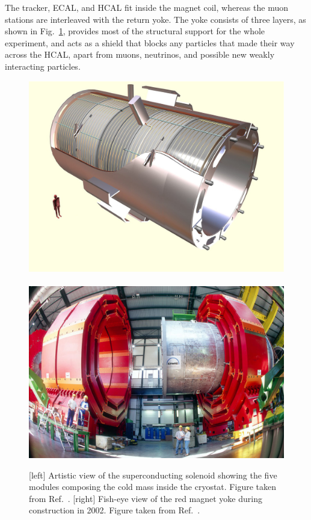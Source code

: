 The tracker, ECAL, and HCAL fit inside the magnet coil, whereas the muon stations are interleaved
with the return yoke. The yoke consists of three layers, as shown in Fig.~\ref{fig:cms_magnet},
provides most of the structural support for the whole experiment, and acts as a shield that blocks
any particles that made their way across the HCAL, apart from muons, neutrinos, and possible new
weakly interacting particles. 

\begin{figure}[htpb]
  \centering
  \includegraphics[height=0.2\textheight,clip=true,trim=0 2cm 0 0]{figures/cms/CMS_solenoid}
  ~
  \includegraphics[height=0.2\textheight]{figures/cms/cms_magnet}
  \caption{[left] Artistic view of the superconducting solenoid showing the five modules composing
the cold mass inside the cryostat. Figure taken from Ref.~\cite{Chatrchyan:2008aa}.
  [right] Fish-eye view of the red magnet yoke during construction in
2002. Figure taken from Ref.~\cite{CMS_magnet}.
  \label{fig:cms_magnet}}
\end{figure}

